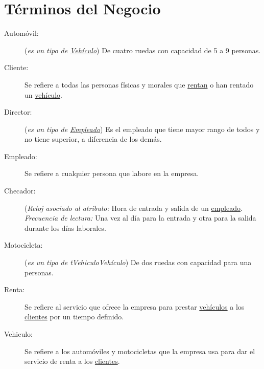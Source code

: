 	
\section{Términos del Negocio}
\label{sec:terminosDeNegocio}

	
\begin{description}
	\item[\hypertarget{tAutomovil}{Automóvil:}] ({\em es un tipo de \hyperlink{tVehiculo}{Vehículo}}) De cuatro ruedas con capacidad de 5 a 9 personas. 
	\item[\hypertarget{tCliente}{Cliente:}] Se refiere a todas las personas físicas y morales que \hyperlink{tRenta}{rentan} o han rentado un \hyperlink{tVehiculo}{vehículo}.
	
	\item[\hypertarget{tDirector}{Director:}] ({\em es un tipo de \hyperlink{tEmpleado}{Empleado}}) Es el empleado que tiene mayor rango de todos y no tiene superior, a diferencia de los demás.	
	\item[\hypertarget{tEmpleado}{Empleado:}] Se refiere a cualquier persona que labore en la empresa.
	
	\item[\hypertarget{tChecador}{Checador:}] ({\em Reloj asociado al atributo:} Hora de entrada y salida de un \hyperlink{tEmpleado}{empleado}. {\em Frecuencia de lectura:} Una vez al día para la entrada y otra para la salida durante los días laborales.
	
	\item[\hypertarget{tMotocicleta}{Motocicleta:}] ({\em es un tipo de {tVehiculo}{Vehículo}}) De dos ruedas con capacidad para una personas. 

	\item[\hypertarget{tRenta}{Renta:}] Se refiere al servicio que ofrece la empresa para prestar \hyperlink{tVehiculo}{vehículos} a los \hyperlink{tCliente}{clientes} por un tiempo definido.
	
	\item[\hypertarget{tVehiculo}{Vehiculo:}] Se refiere a los automóviles y motocicletas que la empresa usa para dar el servicio de renta a los \hyperlink{tCliente}{clientes}.
	
\end{description}

